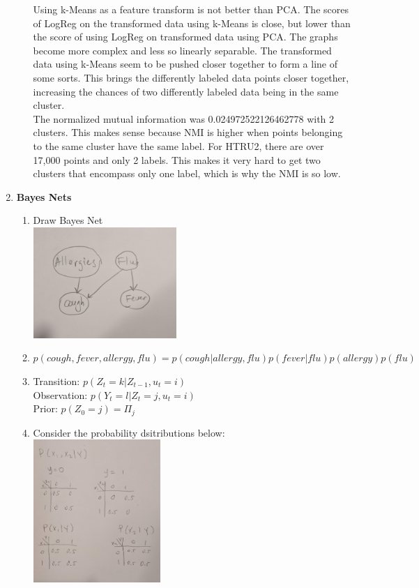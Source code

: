 \documentclass[12pt]{article}
\newcommand{\nextproblem}{
	\vfill
	\pagebreak
}
\begin{document}
\begin{enumerate}[leftmargin=\parindent,align=left,labelwidth=\parindent,noitemsep]
\begin{itemize}[noitemsep,topsep=1pt]
\begin{itemize}
    \end{itemize}
    Using k-Means as a feature transform is not better than PCA. The scores of LogReg on the transformed data using k-Means is close, but lower than the score of using LogReg on transformed data using PCA. The graphs become more complex and less so linearly separable. The transformed data using k-Means seem to be pushed closer together to form a line of some sorts. This brings the differently labeled data points closer together, increasing the chances of two differently labeled data being in the same cluster. \\
    The normalized mutual information was 0.024972522126462778 with 2 clusters. This makes sense because NMI is higher when points belonging to the same cluster have the same label. For HTRU2, there are over 17,000 points and only 2 labels. This makes it very hard to get two clusters that encompass only one label, which is why the NMI is so low.
\end{itemize}
\nextproblem
\item \textbf{Bayes Nets}
\begin{enumerate}[noitemsep,topsep=2pt]
    \item Draw Bayes Net \\
    \includegraphics[width=0.45\textwidth]{3a}
    \item $p(cough,fever,allergy,flu) = p(cough\vert allergy,flu)p(fever\vert flu)p(allergy)p(flu)$
    \item Transition: $p(Z_t=k\vert Z_{t-1},u_t=i)$ \\
    Observation: $p(Y_t=l\vert Z_t=j,u_t=i)$ \\
    Prior: $p(Z_0=j)=\Pi_j$
    \item Consider the probability dsitributions below: \\ \includegraphics[width=0.4\textwidth]{3d} \\

\end{enumerate}
\end{enumerate}
\end{document}
